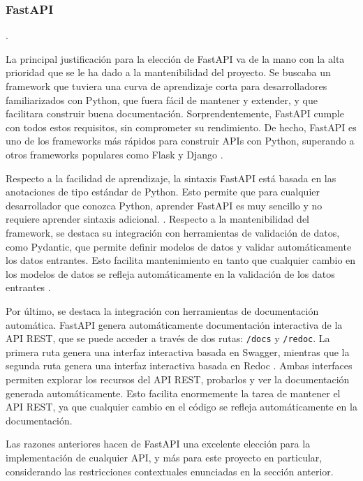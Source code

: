 \subsubsection{FastAPI}

 \cite{fastapi_docs}.

La principal justificación para la elección de FastAPI va de la mano con la alta prioridad que se le ha dado a la mantenibilidad del proyecto. Se buscaba un framework que tuviera una curva de aprendizaje corta para desarrolladores familiarizados con Python, que fuera fácil de mantener y extender, y que facilitara construir buena documentación. Sorprendentemente, FastAPI cumple con todos estos requisitos, sin comprometer su rendimiento. De hecho, FastAPI es uno de los frameworks más rápidos para construir APIs con Python, superando a otros frameworks populares como Flask y Django \cite{fastapi_benchmarks}.

Respecto a la facilidad de aprendizaje, la sintaxis FastAPI está basada en las anotaciones de tipo estándar de Python. Esto permite que para cualquier desarrollador que conozca Python, aprender FastAPI es muy sencillo y no requiere aprender sintaxis adicional. \cite{fastapi_functionalities}. Respecto a la mantenibilidad del framework, se destaca su integración con herramientas de validación de datos, como \gls{Pydantic}, que permite definir modelos de datos y validar automáticamente los datos entrantes. Esto facilita mantenimiento en tanto que cualquier cambio en los modelos de datos se refleja automáticamente en la validación de los datos entrantes \cite{fastapi_functionalities}.

Por último, se destaca la integración con herramientas de documentación automática. FastAPI genera automáticamente documentación interactiva de la API REST, que se puede acceder a través de dos rutas: \verb|/docs| y \verb|/redoc|. La primera ruta genera una interfaz interactiva basada en \gls{Swagger}, mientras que la segunda ruta genera una interfaz interactiva basada en \gls{Redoc} \cite{fastapi_functionalities}. Ambas interfaces permiten explorar los recursos del API REST, probarlos y ver la documentación generada automáticamente. Esto facilita enormemente la tarea de mantener el API REST, ya que cualquier cambio en el código se refleja automáticamente en la documentación.

Las razones anteriores hacen de FastAPI una excelente elección para la implementación de cualquier API, y más para este proyecto en particular, considerando las restricciones contextuales enunciadas en la sección anterior.

